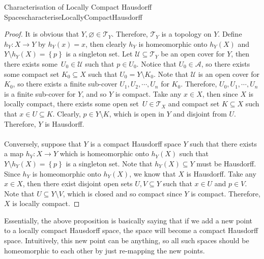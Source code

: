 \documentclass[math]{amznotes}
\theoremstyle{remark}
\begin{document}
\begin{probox}{Characterisation of Locally Compact Hausdorff Spaces}{characteriseLocallyCompactHausdorff}
\begin{proof}
        It is obvious that $Y, \varnothing \in \mathcal{T}_Y$. Therefore, $\mathcal{T}_Y$ is a topology on $Y$. Define $h_Y \colon X \to Y$ by $h_Y\left(x\right) = x$, then clearly $h_Y$ is homeomorphic onto $h_Y\left(X\right)$ and $Y \setminus h_Y\left(X\right) = \left\{p\right\}$ is a singleton set. Let $\mathcal{U} \subseteq \mathcal{T}_Y$ be an open cover for $Y$, then there exists some~$U_0 \in \mathcal{U}$ such that $p \in U_0$. Notice that $U_0 \in \mathcal{A}$, so there exists some compact set $K_0 \subseteq X$ such that $U_0 = Y \setminus K_0$. Note that $\mathcal{U}$ is an open cover for $K_0$, so there exists a finite sub-cover $U_1, U_2, \cdots, U_n$ for $K_0$. Therefore, $U_0, U_1, \cdots, U_n$ is a finite sub-cover for $Y$, and so $Y$ is compact. Take any $x \in X$, then since $X$ is locally compact, there exists some open set~$U \in \mathcal{T}_X$ and compact set $K \subseteq X$ such that $x \in U \subseteq K$. Clearly, $p \in Y \setminus K$, which is open in $Y$ and disjoint from $U$. Therefore, $Y$ is Hausdorff.
        \\\\
        Conversely, suppose that $Y$ is a compact Hausdorff space $Y$ such that there exists a map $h_Y \colon X \to Y$ which is homeomorphic onto $h_Y\left(X\right)$ such that $Y \setminus h_Y\left(X\right) = \left\{p\right\}$ is a singleton set. Note that $h_Y\left(X\right) \subseteq Y$ must be Hausdorff. Since $h_Y$ is homeomorphic onto $h_Y\left(X\right)$, we know that $X$ is Hausdorff. Take any $x \in X$, then there exist disjoint open sets $U, V \subseteq Y$ such that $x \in U$ and $p \in V$. Note that $U \subseteq Y \setminus V$, which is closed and so compact since $Y$ is compact. Therefore, $X$ is locally compact.
    \end{proof}
\end{probox}
Essentially, the above proposition is basically saying that if we add a new point to a locally compact Hausdorff space, the space will become a compact Hausdorff space. Intuitively, this new point can be anything, so all such spaces should be homeomorphic to each other by just re-mapping the new points.
\end{document}
